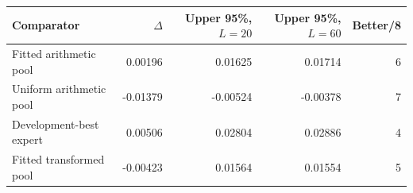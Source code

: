 \begin{tabular}{lrrrr}\toprule
Comparator & $\Delta$ & Upper 95\%, $L=20$ & Upper 95\%, $L=60$ & Better/8\\\midrule
Fitted arithmetic pool & 0.00196 & 0.01625 & 0.01714 & 6\\
Uniform arithmetic pool & -0.01379 & -0.00524 & -0.00378 & 7\\
Development-best expert & 0.00506 & 0.02804 & 0.02886 & 4\\
Fitted transformed pool & -0.00423 & 0.01564 & 0.01554 & 5\\
\bottomrule\end{tabular}

